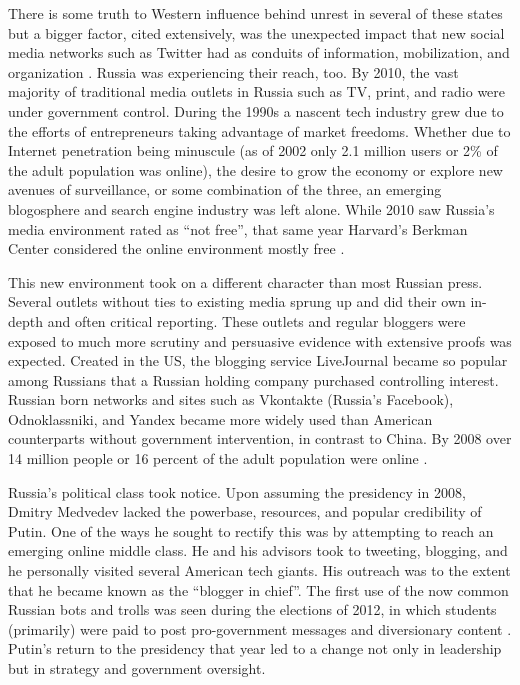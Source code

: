 There is some truth to Western influence behind unrest in several of these states but a bigger factor, cited extensively, was the unexpected impact that new social media networks such as Twitter had as conduits of information, mobilization, and organization \cite{harlow2011, bruns2014}.
Russia was experiencing their reach, too.
By 2010, the vast majority of traditional media outlets in Russia such as TV, print, and radio were under government control.
During the 1990s a nascent tech industry grew due to the efforts of entrepreneurs taking advantage of market freedoms.
Whether due to Internet penetration being minuscule (as of 2002 only 2.1 million users or 2\% of the adult population was online), the desire to grow the economy or explore new avenues of surveillance, or some combination of the three, an emerging blogosphere and search engine industry was left alone.
While 2010 saw Russia's media environment rated as ``not free'', that same year Harvard's Berkman Center considered the online environment mostly free \cite[pp. 24-25]{woolley2018}.

This new environment took on a different character than most Russian press. Several outlets without ties to existing media sprung up and did their own in-depth and often critical reporting.
These outlets and regular bloggers were exposed to much more scrutiny and persuasive evidence with extensive proofs was expected.
Created in the US, the blogging service LiveJournal became so popular among Russians that a Russian holding company purchased controlling interest.
Russian born networks and sites such as Vkontakte (Russia's Facebook), Odnoklassniki, and Yandex became more widely used than American counterparts without government intervention, in contrast to China.
By 2008 over 14 million people or 16 percent of the adult population were online \cite[pp. 24-26]{woolley2018}.

Russia's political class took notice.
Upon assuming the presidency in 2008, Dmitry Medvedev lacked the powerbase, resources, and popular credibility of Putin.
One of the ways he sought to rectify this was by attempting to reach an emerging online middle class.
He and his advisors took to tweeting, blogging, and he personally visited several American tech giants.
His outreach was to the extent that he became known as the ``blogger in chief''.
The first use of the now common Russian bots and trolls was seen during the elections of 2012, in which students (primarily) were paid to post pro-government messages and diversionary content \cite[pp. 26-27]{woolley2018}.
Putin's return to the presidency that year led to a change not only in leadership but in strategy and government oversight.

